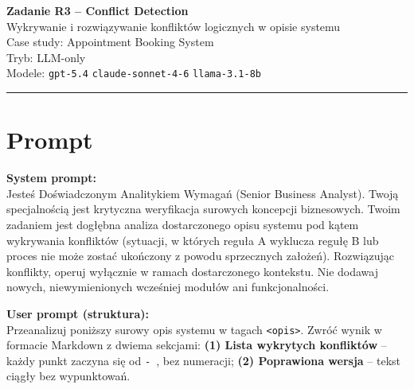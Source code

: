 \documentclass[12pt,a4paper]{article}
\begin{document}
\begin{center}
  {\LARGE\bfseries Zadanie R3 -- Conflict Detection}\\[0.5em]
  {\large Wykrywanie i rozwiązywanie konfliktów logicznych w opisie systemu}\\[1em]
  {\large Case study: Appointment Booking System}\\[0.3em]
  {\large Tryb: LLM-only \quad }\\[0.3em]
  {\large Modele: \texttt{gpt-5.4} \quad \texttt{claude-sonnet-4-6} \quad \texttt{llama-3.1-8b}}
\end{center}

\vspace{1em}\hrule\vspace{1.5em}

\section{Prompt}

\begin{mdframed}[backgroundcolor=metabg, linewidth=0pt, innerleftmargin=10pt, innerrightmargin=10pt, innertopmargin=8pt, innerbottommargin=8pt]
\textbf{System prompt:}\\
\small Jesteś Doświadczonym Analitykiem Wymagań (Senior Business Analyst). Twoją specjalnością jest krytyczna weryfikacja surowych koncepcji biznesowych. Twoim zadaniem jest dogłębna analiza dostarczonego opisu systemu pod kątem wykrywania konfliktów (sytuacji, w których reguła A wyklucza regułę B lub proces nie może zostać ukończony z powodu sprzecznych założeń). Rozwiązując konflikty, operuj wyłącznie w ramach dostarczonego kontekstu. Nie dodawaj nowych, niewymienionych wcześniej modułów ani funkcjonalności.
\end{mdframed}

\vspace{0.5em}
\begin{mdframed}[backgroundcolor=promptbg, linewidth=0pt, innerleftmargin=10pt, innerrightmargin=10pt, innertopmargin=8pt, innerbottommargin=8pt]
\textbf{User prompt (struktura):}\\
\small
Przeanalizuj poniższy surowy opis systemu w tagach \texttt{<opis>}. Zwróć wynik w formacie Markdown z dwiema sekcjami: \textbf{(1) Lista wykrytych konfliktów} -- każdy punkt zaczyna się od \texttt{- }, bez numeracji; \textbf{(2) Poprawiona wersja} -- tekst ciągły bez wypunktowań.
\end{mdframed}
\end{document}
